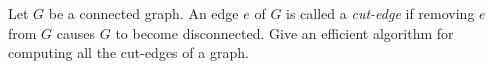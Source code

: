 Let $G$ be a connected graph.  An edge $e$ of $G$ is called a {\em cut-edge}
if removing $e$ from $G$ causes $G$ to become disconnected.
Give an efficient algorithm for computing all the cut-edges of a graph.
